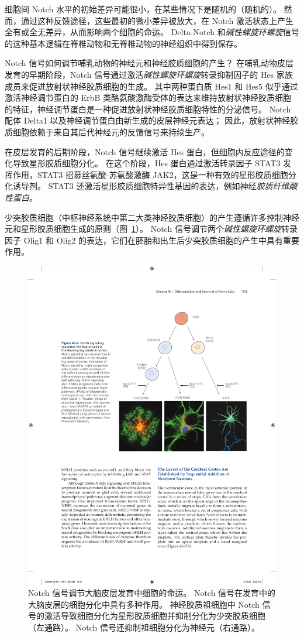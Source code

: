 细胞间 Notch 水平的初始差异可能很小，在某些情况下是随机的（随机的）。
然而，通过这种反馈途径，这些最初的微小差异被放大，在 Notch 激活状态上产生全有或全无差异，从而影响两个细胞的命运。
Delta-Notch 和\textit{碱性螺旋环螺旋}信号的这种基本逻辑在脊椎动物和无脊椎动物的神经组织中得到保存。


Notch 信号如何调节哺乳动物的神经元和神经胶质细胞的产生？
在哺乳动物皮层发育的早期阶段，Notch 信号通过激活\textit{碱性螺旋环螺旋}转录抑制因子的 Hes 家族成员来促进放射状神经胶质细胞的生成。
其中两种蛋白质 Hes1 和 Hes5 似乎通过激活神经调节蛋白的 ErbB 类酪氨酸激酶受体的表达来维持放射状神经胶质细胞的特征，神经调节蛋白是一种促进放射状神经胶质细胞特性的分泌信号。
Notch 配体 Delta1 以及神经调节蛋白由新生成的皮层神经元表达；
因此，放射状神经胶质细胞依赖于来自其后代神经元的反馈信号来持续生产。


在皮层发育的后期阶段，Notch 信号继续激活 Hes 蛋白，但细胞内反应途径的变化导致星形胶质细胞分化。
在这个阶段，Hes 蛋白通过激活转录因子 STAT3 发挥作用，STAT3 招募丝氨酸-苏氨酸激酶 JAK2，这是一种有效的星形胶质细胞分化诱导剂。
STAT3 还激活星形胶质细胞特异性基因的表达，例如神经\textit{胶质纤维酸性蛋白}。


少突胶质细胞（中枢神经系统中第二大类神经胶质细胞）的产生遵循许多控制神经元和星形胶质细胞生成的原则（图~\ref{fig:46_4}）。
Notch 信号调节两个\textit{碱性螺旋环螺旋}转录因子 Olig1 和 Olig2 的表达，它们在胚胎和出生后少突胶质细胞的产生中具有重要作用。


\begin{figure}[htbp]
	\centering
	\includegraphics[width=0.8\linewidth]{chap46/fig_46_4}
	\caption{Notch 信号调节大脑皮层发育中细胞的命运。
		Notch 信号在发育中的大脑皮层的细胞分化中具有多种作用。
		神经胶质祖细胞中 Notch 信号的激活导致细胞分化为星形胶质细胞并抑制分化为少突胶质细胞（左通路）。
		Notch 信号还抑制祖细胞分化为神经元（右通路）。}
	\label{fig:46_4}
\end{figure}


